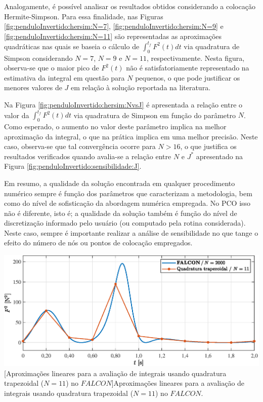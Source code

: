 Analogamente, é possível analisar os resultados obtidos considerando a colocação Hermite-Simpson. Para essa finalidade, nas Figuras \ref{fig:penduloInvertido:hersim:N=7}, \ref{fig:penduloInvertido:hersim:N=9} e \ref{fig:penduloInvertido:hersim:N=11} são representadas as aproximações quadráticas nas quais se baseia o cálculo de $ \int_{0}^{t_f} F^2(t) dt $ via quadratura de Simpson considerando $ N = 7 $, $ N = 9 $ e $ N = 11 $, respectivamente. Nesta figura, observa-se que o maior pico de $ F^2(t) $ não é satisfatoriamente representado na estimativa da integral em questão para $ N $ pequenos, o que pode justificar os menores valores de $J$ em relação à solução reportada na literatura. 

Na Figura \ref{fig:penduloInvertido:hersim:NvsJ} é apresentada a relação entre o valor da $ \int_{0}^{t_f} F^2(t) dt $ via quadratura de Simpson em função do parâmetro $ N $. Como esperado, o aumento no valor deste parâmetro implica na melhor aproximação da integral, o que na prática implica em uma melhor precisão. Neste caso, observa-se que tal convergência ocorre para $ N > 16 $, o que justifica os resultados verificados quando avalia-se a relação entre $ N $ e $ J^* $ apresentado na Figura \ref{fig:penduloInvertido:sensibilidade:J}.

Em resumo, a qualidade da solução encontrada em qualquer procedimento numérico sempre é função dos parâmetros que caracterizam a metodologia, bem como do nível de sofisticação da abordagem numérica empregada. No 
PCO isso não é diferente, isto é; a qualidade da solução também é função do nível de discretização informado pelo usuário (ou computado pela rotina considerada). Neste caso, sempre é importante realizar a análise de sensibilidade no que tange o efeito do número de nós ou pontos de colocação empregados.

\noindent	
\begin{minipage}{\textwidth}
	\vspace{\onelineskip}
	\centering
	\includegraphics[scale=0.7]{fig/resultados/penduloInvertido/obs/trap/N=11}
	[Aproximações lineares para a avaliação de integrais usando quadratura trapezoidal ($ N = 11 $) no $ FALCON $]{Aproximações lineares para a avaliação de integrais usando quadratura trapezoidal ($ N = 11 $) no $ FALCON $.}
	\label{fig:penduloInvertido:trap:N=11}
	\vspace{\onelineskip}
\end{minipage}

